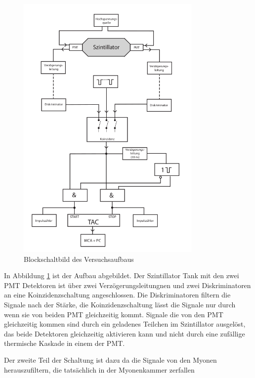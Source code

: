 \begin{figure}
	\centering
	\includegraphics[width=0.8\textwidth]{./Bilder/aufbau.png}
	\caption{Blockschaltbild des Versuchsaufbaus}\label{fig:aufbau}
\end{figure}

In Abbildung \ref{fig:aufbau} ist der Aufbau abgebildet.
Der Szintillator Tank mit den zwei PMT Detektoren ist über zwei Verzögerungsleitungnen
und zwei Diskriminatoren an eine Koinzidenzschaltung angeschlossen. 
Die Diskriminatoren filtern die Signale nach der Stärke, die Koinzidenzschaltung
lässt die Signale nur durch wenn sie von beiden PMT gleichzeitig kommt.
Signale die von den PMT gleichzeitig kommen sind durch ein geladenes Teilchen im Szintillator
ausgelöst, das beide Detektoren gleichzeitig aktivieren kann und nicht durch eine zufällige 
thermische Kaskade in einem der PMT.

Der zweite Teil der Schaltung ist dazu da die Signale von den Myonen herauszufiltern, die tatsächlich
in der Myonenkammer zerfallen


